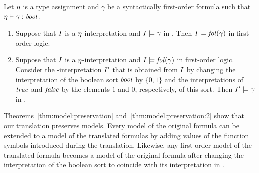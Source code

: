 \begin{theorem}\label{thm:model:preservation:2}\rm
  Let $\eta$ is a type assignment and $\gamma$ be a syntactically first-order formula such that $\eta \vdash \gamma:\mathit{bool}$.
  \begin{enumerate}
  \item Suppose that $I$ is a $\eta$-interpretation and $I \models \gamma$ in \folb. Then $I \models \mathit{fol}(\gamma)$ in first-order logic.
  \item Suppose that $I$ is a $\eta$-interpretation and $I \models \mathit{fol}(\gamma)$ in first-order logic. Consider the \folb-interpretation $I'$ that is obtained from $I$ by changing the interpretation of the boolean sort $\mathit{bool}$ by $\{0,1\}$ and the interpretations of $\mathit{true}$ and $\mathit{false}$ by the elements $1$ and $0$, respectively, of this sort. Then $I' \models \gamma$ in \folb. \QED
  \end{enumerate}
\end{theorem}

Theorems~\ref{thm:model:preservation} and~\ref{thm:model:preservation:2} show that our translation preserves models. Every model of the original formula can be extended to a model of the translated formulas by adding values of the function symbols introduced during the translation. Likewise, any first-order model of the translated formula becomes a model of the original formula after changing the interpretation of the boolean sort to coincide with its interpretation in \folb.